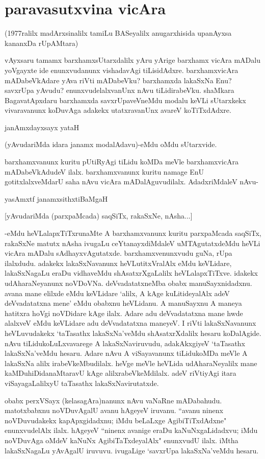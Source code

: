 \chapter{paravasutxvina vicAra}\label{chap13}

(1977ralilx madArxsinalilx tamiLu BASeyalilx anugarxhisida upanAyxsa kananxDa rUpAMtara)

vAyxsaru tamamx barxhamxsUtarxdalilx yAru yArige barxhamx vicAra mADalu yoVgayxte ide enunxvudanunx vishadavAgi tiLisidAdxre. barxhamxvicAra mADabeVkAdare yAva riVti mADabeVku? barxhamxda lakaSxNa Enu? savxrUpa yAvudu? enunxvudelalxvanUnx nAvu tiLidirabeVku. shaMkara BagavatApxdaru barxhamxda savxrUpaveVneMdu modalu keVLi sUtarxkekx vivaravanunx koDuvAga adakekx utatxravanUnx avareV koTiTxdAdxre. 

janAmxdayxsayx yataH

(yAvudariMda idara janamx modalAdavu)-eMdu oMdu sUtarxvide. 

barxhamxvanunx kuritu pUtiRyAgi tiLidu koMDa meVle barxhamxvicAra mADabeVkAdudeV ilalx. barxhamxvanunx kuritu namage EnU gotitxlalxveMdarU saha nAvu vicAra mADalAguvudilalx. AdadxriMdaleV nAvu- 

yasAmxtf janamxsithxtiBaMgaH

[yAvudariMda (parxpaMcada) saqSiTx, rakaSxNe, nAsha...]

-eMdu heVLalapxTiTxrunaMte A barxhamxvanunx kuritu parxpaMcada saqSiTx, rakaSxNe matutx nAsha ivugaLu ceYtanayxdiMdaleV uMTAgutatxdeMdu heVLi vicAra mADalu sAdhayxvAgutatxde. barxhamxvenunxvudu guNa, rUpa ilalxdudu. adakekx lakaSxNavanunx heVLutitxVralAlx eMdu keVLidare, lakaSxNagaLu eraDu vidhaveMdu shAsatxrXgaLalilx heVLalapxTiTxve. idakekx udAharaNeyanunx noVDoVNa. deVvadatatxneMba obabx manuSayxnidadxnu. avana mane elilxde eMdu keVLidare `alilx, A kAge kuLitideyalAlx adeV deVvadatatxna mene' eMdu obabxnu heVLidanu. A manuSayxnu A maneya hatitxra hoVgi noVDidare kAge ilalx. Adare adu deVvadatatxna mane hwde alalxveV eMdu keVLidare adu deVvadatatxna maneyeV. I riVti lakaSxNavanunx heVLuvudakekx `taTasathx lakaSxNa'veMdu shAsatxrXdalilx hesaru koDalAgide. nAvu tiLidukoLuLxvavarege A lakaSxNaviruvudu, adakAkxgiyeV `taTasathx lakaSxNa'veMdu hesaru. Adare nAvu A viSayavanunx tiLidukoMDa meVle A lakaSxNa alilx irabeVkeMbudilalx. heVge meVle heVLida udAharaNeyalilx mane kaMDuhiDidanaMtaravU kAge alilxrabeVkeMdilalx. adeV riVtiyAgi itara viSayagaLalilxyU taTasathx lakaSxNavirutatxde. 

obabx perxVSayx (kelasagAra)nanunx nAvu vaNaRne mADabahudu. matotxbabxnu noVDuvAgalU avanu hAgeyeV iruvanu. ``avanu ninenx noVDuvudakekx kapApxgidadxnu; iMdu beLaLxge AgibiTiTxdAdxne" enunxvudelAlx ilalx. hAgeyeV ``ninenx avanige eraDu kaNuNxgaLidadxvu; iMdu noVDuvAga oMdeV kaNuNx AgibiTaTxdeyalAlx" enunxvudU ilalx. iMtha lakaSxNagaLu yAvAgalU iruvuvu. ivugaLige `savxrUpa lakaSxNa'veMdu hesaru.

